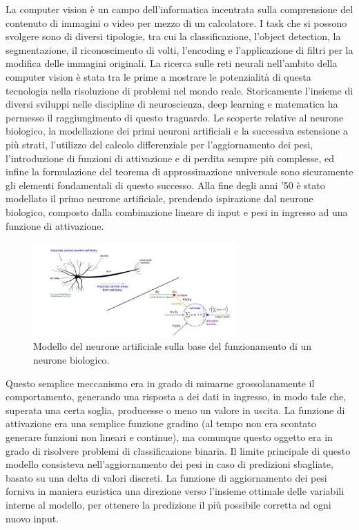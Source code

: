 La computer vision è un campo dell'informatica incentrata sulla comprensione del contenuto di immagini o video per mezzo di un calcolatore. I task che si possono svolgere sono di diversi tipologie, tra cui la classificazione, l'object detection, la segmentazione, il riconoscimento di volti, l'encoding e l'applicazione di filtri per la modifica delle immagini originali. La ricerca sulle reti neurali nell'ambito della computer vision è stata tra le prime a mostrare le potenzialità di questa tecnologia nella risoluzione di problemi nel mondo reale. Storicamente l'insieme di diversi sviluppi nelle discipline di neuroscienza, deep learning e matematica ha permesso il raggiungimento di questo traguardo. Le scoperte relative al neurone biologico, la modellazione dei primi neuroni artificiali e la successiva estensione a più strati, l'utilizzo del calcolo differenziale per l'aggiornamento dei pesi, l'introduzione di funzioni di attivazione e di perdita sempre più complesse, ed infine la formulazione del teorema di approssimazione universale sono sicuramente gli elementi fondamentali di questo successo. Alla fine degli anni '50 è stato modellato il primo neurone artificiale, prendendo ispirazione dal neurone biologico, composto dalla combinazione lineare di input e pesi in ingresso ad una funzione di attivazione.

\begin{figure}[htbp]
    \centering
    \includegraphics[width=0.7\textwidth]{figures/perceptron.png}
    \caption{Modello del neurone artificiale sulla base del funzionamento di un neurone biologico.}
    \label{fig:perceptron}
\end{figure}

\noindent Questo semplice meccanismo era in grado di mimarne grossolanamente il comportamento, generando una risposta a dei dati in ingresso, in modo tale che, superata una certa soglia, producesse o meno un valore in uscita. La funzione di attivazione era una semplice funzione gradino (al tempo non era scontato generare funzioni non lineari e continue), ma comunque questo oggetto era in grado di risolvere problemi di classificazione binaria. Il limite principale di questo modello consisteva nell'aggiornamento dei pesi in caso di predizioni sbagliate, basato su una delta di valori discreti. La funzione di aggiornamento dei pesi forniva in maniera euristica una direzione verso l'insieme ottimale delle variabili interne al modello, per ottenere la predizione il più possibile corretta ad ogni nuovo input. 

